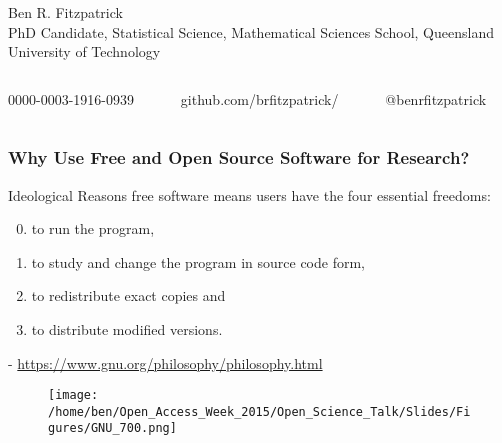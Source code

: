 \documentclass[xcolor=dvipsnames]{beamer}
\begin{document}
\begin{frame}
\begin{figure}
\begin{columns}
\end{columns}
\end{figure}

\small Ben R. Fitzpatrick\\
\tiny PhD Candidate, Statistical Science, Mathematical Sciences School, Queensland University of Technology
\newline
\begin{columns}
\begin{column}{3cm}
\tiny 0000-0003-1916-0939
\end{column}
\begin{column}{3cm}
\tiny github.com/brfitzpatrick/
\end{column}
\begin{column}{3cm}
\tiny @benrfitzpatrick
\end{column}
\end{columns}
\end{frame}

\begin{frame}
\frametitle{Why Use Free and Open Source Software for Research?}
\begin{block}{Ideological Reasons}
free software means users have the four essential freedoms: \begin{enumerate}
 \setcounter{enumi}{-1}
 \item to run the program, 
 \item to study and change the program in source code form,
 \item to redistribute exact copies and
 \item to distribute modified versions. \end{enumerate}
\begin{center} \small- \url{https://www.gnu.org/philosophy/philosophy.html}
\end{center}
\end{block}

\begin{center}
\begin{figure}
\texttt{[image: /home/ben/Open\_Access\_Week\_2015/Open\_Science\_Talk/Slides/Figures/GNU\_700.png]}
\end{figure}
\end{center}


\end{frame}
\end{document}
